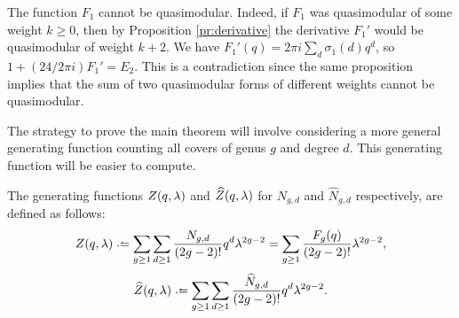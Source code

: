 The function $F_1$ cannot be quasimodular. Indeed, if $F_1$ was quasimodular of some weight $k\geq0$, then by Proposition \ref{pr:derivative} the derivative $F_1'$ would be quasimodular of weight $k+2$. We have $F_1'(q)=2\pi i\sum_{d}\sigma_1(d)q^d$, so $1+(24/2\pi i)F_1'=E_2$. This is a contradiction since the same proposition implies that the sum of two quasimodular forms of different weights cannot be quasimodular.

The strategy to prove the main theorem will involve considering a more general generating function counting all covers of genus $g$ and degree $d$. This generating function will be easier to compute.

\begin{defi}
 The generating functions $Z(q,\lambda)$ and $\widehat{Z}(q,\lambda)$ for $N_{g,d}$ and $\widehat{N}_{g,d}$ respectively, are defined as follows:
 \[Z(q,\lam) \defeq \sum_{g\geq 1}\sum_{d\geq 1} \frac{N_{g,d}}{(2g-2)!}q^d\lam^{2g-2} 
 = \sum_{g\geq 1}\frac{F_g(q)}{(2g-2)!}\lam^{2g-2},\]
 \[\widehat{Z}(q,\lam) \defeq \sum_{g\geq 1}\sum_{d\geq 1} \frac{\widehat{N}_{g,d}}{(2g-2)!}q^d\lam^{2g-2}.\]
\end{defi}


